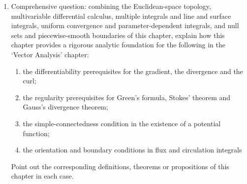 \begin{enumerate}[leftmargin=3em, label=\textbf{Exercise \arabic*}]
    \item Comprehensive question: combining the Euclidean-space topology, multivariable differential calculus,
    multiple integrals and line and surface integrals, uniform convergence and parameter-dependent integrals, and null sets and piecewise-smooth boundaries of this chapter,
    explain how this chapter provides a rigorous analytic foundation for the following in the `Vector Analysis' chapter:
    \begin{enumerate}[label=(\roman*)]
        \item the differentiability prerequisites for the gradient, the divergence and the curl;
        \item the regularity prerequisites for Green's formula, Stokes' theorem and Gauss's divergence theorem;
        \item the simple-connectedness condition in the existence of a potential function;
        \item the orientation and boundary conditions in flux and circulation integrals
    \end{enumerate}
    Point out the corresponding definitions, theorems or propositions of this chapter in each case.

\end{enumerate}
